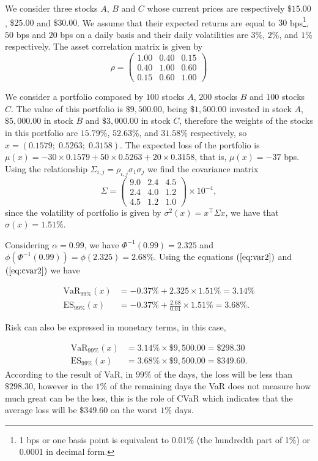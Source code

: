 \begin{example}\normalfont
	We consider three stocks $A$, $B$ and $C$ whose current prices are respectively $\$ 15.00$, $\$ 25.00$ and $\$ 30.00$. We assume that their expected returns are equal to $30$ bps\footnote{1 bps or one basis point is equivalent to
		0.01\% (the hundredth part of 1\%) or 0.0001 in decimal form.}, $50$ bps and $20$ bps on a daily basis and their daily volatilities are $3\%$, $2\%$, and $1\%$ respectively. The asset correlation matrix is given by
	\[
		\rho = \left(
		\begin{array}{rrr}
				1.00 & 0.40 & 0.15 \\
				0.40 & 1.00 & 0.60 \\
				0.15 & 0.60 & 1.00
			\end{array}
		\right)
	\]

	We consider a portfolio composed by $100$ stocks $A$, $200$ stocks $B$ and $100$ stocks $C$. The value of this portfolio is $\$ 9,500.00$, being $\$ 1,500.00$ invested in stock $A$, $\$ 5,000.00$ in stock $B$ and $\$ 3,000.00$ in stock $C$, therefore the weights of the stocks in this portfolio are $15.79\%$, $52.63\%$, and $31.58\%$ respectively, so $x=(0.1579;\;0.5263;\; 0.3158)$. The expected loss of the portfolio is $\mu(x) = -30\times0.1579+50\times0.5263+20\times0.3158$, that is, $\mu(x) = -37$ bps. Using the relationship $\Sigma_{i,j}=\rho_{i,j}\sigma_1\sigma_j$ we find the covariance matrix
	\[
		\Sigma = \left(
		\begin{array}{llr}
				9.0 & 2.4 & 4.5 \\
				2.4 & 4.0 & 1.2 \\
				4.5 & 1.2 & 1.0
			\end{array}
		\right)\times10^{-4},
	\] since the volatility of portfolio is given by $\sigma^2(x) = x^\top \Sigma x$, we have that $\sigma(x) = 1.51\%$.

	Considering $\alpha = 0.99$, we have $\Phi^{-1}(0.99) = 2.325$ and
	$\phi(\Phi^{-1}(0.99))=\phi(2.325)=2.68\%$. Using the equations
	$(\ref{eq:var2})$ and $(\ref{eq:cvar2})$ we have

	\[
		\begin{aligned}
			\mathrm{VaR}_{99\%}(x) & = -0.37\% + 2.325 \times 1.51\% = 3.14\%              \\
			\mathrm{ES}_{99\%}(x)  & = -0.37\% + \frac{2.68}{0.01} \times 1.51\% = 3.68\%.
		\end{aligned}
	\]

	Risk can also be expressed in monetary terms, in this case,

	\[
		\begin{aligned}
			\mathrm{VaR}_{99\%}(x) & = 3.14\% \times \$ 9,500.00 = \$ 298.30  \\
			\mathrm{ES}_{99\%}(x)  & = 3.68\% \times \$ 9,500.00 = \$ 349.60.
		\end{aligned}
	\]
	According to the result of {\rm VaR}, in $99\%$ of the days, the loss will be less than $\$ 298.30$, however in the $1\%$ of the remaining days the {\rm VaR} does not measure how much great can be the loss, this is the role of {\rm CVaR} which indicates that the average loss will be $\$ 349.60$ on the worst $1\%$ days.
\end{example}


